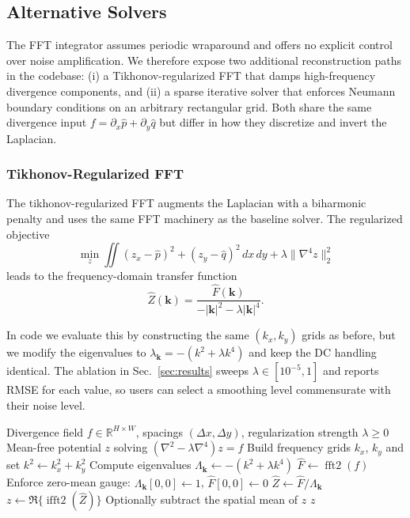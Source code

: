 \documentclass[11pt]{article}
\begin{document}
\subsection{Alternative Solvers}

The FFT integrator assumes periodic wraparound and offers no explicit control over noise amplification. We therefore expose two
additional reconstruction paths in the codebase: (i) a Tikhonov-regularized FFT that damps high-frequency divergence components,
and (ii) a sparse iterative solver that enforces Neumann boundary conditions on an arbitrary rectangular grid. Both share the same
divergence input $f = \partial_x \hat{p} + \partial_y \hat{q}$ but differ in how they discretize and invert the Laplacian.

\subsubsection{Tikhonov-Regularized FFT}

The tikhonov-regularized FFT augments the Laplacian with a biharmonic penalty and uses the same FFT machinery as the baseline solver. The regularized objective
\begin{equation}
\min_z \iint (z_x - \hat{p})^2 + (z_y - \hat{q})^2 \, dx\,dy + \lambda \|\nabla^4 z\|_2^2
\end{equation}
leads to the frequency-domain transfer function
\begin{equation}
\hat{Z}(\mathbf{k}) = \frac{\hat{F}(\mathbf{k})}{-|\mathbf{k}|^2 - \lambda |\mathbf{k}|^4}.
\end{equation}

In code we evaluate this by constructing the same $(k_x,k_y)$ grids as before, but we modify the eigenvalues to $\lambda_{\mathbf{k}} = -(k^2 + \lambda k^4)$ and keep the DC handling identical. 
The ablation in Sec.~\ref{sec:results} sweeps $\lambda \in [10^{-5},1]$ and reports RMSE for each value, so users can select a smoothing level commensurate with their noise level.

\begin{algorithm}[H]
\caption{FFT Poisson Solver with Tikhonov Regularization}
\begin{algorithmic}[1]
\REQUIRE Divergence field $f \in \mathbb{R}^{H \times W}$, spacings $(\Delta x,\Delta y)$, regularization strength $\lambda \ge 0$
\ENSURE Mean-free potential $z$ solving $(\nabla^2 - \lambda \nabla^4) z = f$
\STATE Build frequency grids $k_x$, $k_y$ and set $k^2 \leftarrow k_x^2 + k_y^2$
\STATE Compute eigenvalues $\Lambda_{\mathbf{k}} \leftarrow -(k^2 + \lambda k^4)$
\STATE $\hat{F} \leftarrow \operatorname{fft2}(f)$
\STATE Enforce zero-mean gauge: $\Lambda_{\mathbf{k}}[0,0] \leftarrow 1$, $\hat{F}[0,0] \leftarrow 0$
\STATE $\hat{Z} \leftarrow \hat{F} / \Lambda_{\mathbf{k}}$
\STATE $z \leftarrow \Re\{\operatorname{ifft2}(\hat{Z})\}$
\STATE Optionally subtract the spatial mean of $z$
\RETURN $z$
\end{algorithmic}
\end{algorithm}
\end{document}

